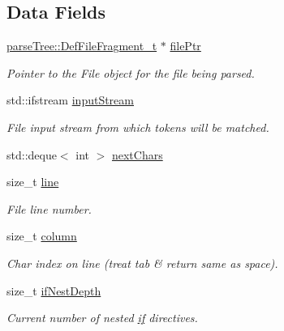 \subsection*{Data Fields}
\begin{DoxyCompactItemize}
\item 
\hyperlink{structparse_tree_1_1_def_file_fragment__t}{parse\+Tree\+::\+Def\+File\+Fragment\+\_\+t} $\ast$ \hyperlink{structparser_1_1_lexer__t_1_1_lexer_context__t_a15e7110763ce80683b87d236c138456c}{file\+Ptr}
\begin{DoxyCompactList}\small\item\em Pointer to the File object for the file being parsed. \end{DoxyCompactList}\item 
std\+::ifstream \hyperlink{structparser_1_1_lexer__t_1_1_lexer_context__t_a7efe63cd60e3e171deef92607cd39a76}{input\+Stream}
\begin{DoxyCompactList}\small\item\em File input stream from which tokens will be matched. \end{DoxyCompactList}\item 
std\+::deque$<$ int $>$ \hyperlink{structparser_1_1_lexer__t_1_1_lexer_context__t_afa76bd5451382b220b083b8f6e55dc12}{next\+Chars}
\item 
size\+\_\+t \hyperlink{structparser_1_1_lexer__t_1_1_lexer_context__t_aaa9235da93077dedbc1f36723d73ae1b}{line}
\begin{DoxyCompactList}\small\item\em File line number. \end{DoxyCompactList}\item 
size\+\_\+t \hyperlink{structparser_1_1_lexer__t_1_1_lexer_context__t_ab02b7a88d4d2f6830ff14a3bd067b528}{column}
\begin{DoxyCompactList}\small\item\em Char index on line (treat tab \& return same as space). \end{DoxyCompactList}\item 
size\+\_\+t \hyperlink{structparser_1_1_lexer__t_1_1_lexer_context__t_ab80a60c09bc6d50679883fb42c6dc6bf}{if\+Nest\+Depth}
\begin{DoxyCompactList}\small\item\em Current number of nested \hyperlink{wifi_web_ap_8c_a2bf420bda7cb80e4552dcff350cddbef}{if} directives. \end{DoxyCompactList}\end{DoxyCompactItemize}


